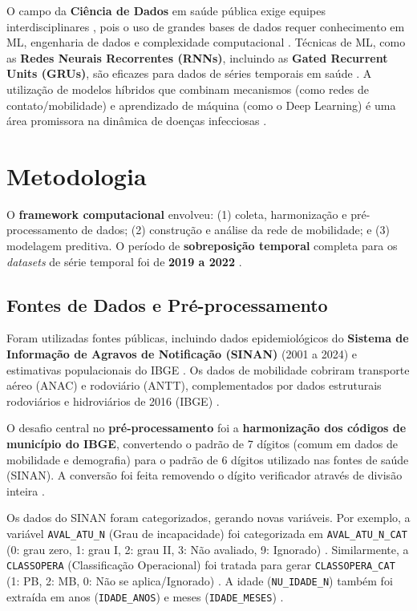 \documentclass[preprint,12pt]{elsarticle}
\begin{document}
O campo da \textbf{Ciência de Dados} em saúde pública exige equipes interdisciplinares \cite{saldanha2021ciencia, goldstein2020convergence}, pois o uso de grandes bases de dados requer conhecimento em ML, engenharia de dados e complexidade computacional \cite{mooney2018big}. Técnicas de ML, como as \textbf{Redes Neurais Recorrentes (RNNs)}, incluindo as \textbf{Gated Recurrent Units (GRUs)}, são eficazes para dados de séries temporais em saúde \cite{shahidi2024exploring, morid2023time}. A utilização de modelos híbridos que combinam mecanismos (como redes de contato/mobilidade) e aprendizado de máquina (como o Deep Learning) é uma área promissora na dinâmica de doenças infecciosas \cite{madden2024deep, silva2022machine}.

\section{Metodologia}

O \textbf{framework computacional} envolveu: (1) coleta, harmonização e pré-processamento de dados; (2) construção e análise da rede de mobilidade; e (3) modelagem preditiva. O período de \textbf{sobreposição temporal} completa para os \textit{datasets} de série temporal foi de \textbf{2019 a 2022} \cite{inovacao2024modelagem}.

\subsection{Fontes de Dados e Pré-processamento}

Foram utilizadas fontes públicas, incluindo dados epidemiológicos do \textbf{Sistema de Informação de Agravos de Notificação (SINAN)} (2001 a 2024) e estimativas populacionais do IBGE \cite{inovacao2024modelagem}. Os dados de mobilidade cobriram transporte aéreo (ANAC) e rodoviário (ANTT), complementados por dados estruturais rodoviários e hidroviários de 2016 (IBGE) \cite{oliveira2024mobility, brasilibge2017ligacoes}.

O desafio central no \textbf{pré-processamento} foi a \textbf{harmonização dos códigos de município do IBGE}, convertendo o padrão de 7 dígitos (comum em dados de mobilidade e demografia) para o padrão de 6 dígitos utilizado nas fontes de saúde (SINAN). A conversão foi feita removendo o dígito verificador através de divisão inteira \cite{inovacao2024modelagem}.

Os dados do SINAN foram categorizados, gerando novas variáveis. Por exemplo, a variável \texttt{AVAL\_ATU\_N} (Grau de incapacidade) foi categorizada em \texttt{AVAL\_ATU\_N\_CAT} (0: grau zero, 1: grau I, 2: grau II, 3: Não avaliado, 9: Ignorado) \cite{preprocessamento}. Similarmente, a \texttt{CLASSOPERA} (Classificação Operacional) foi tratada para gerar \texttt{CLASSOPERA\_CAT} (1: PB, 2: MB, 0: Não se aplica/Ignorado) \cite{preprocessamento}. A idade (\texttt{NU\_IDADE\_N}) também foi extraída em anos (\texttt{IDADE\_ANOS}) e meses (\texttt{IDADE\_MESES}) \cite{preprocessamento}.
\end{document}
